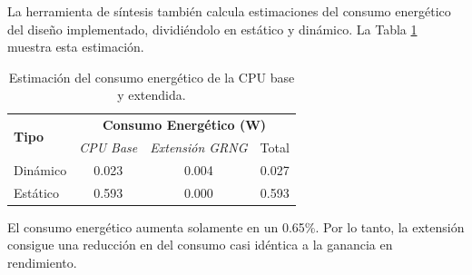 La herramienta de síntesis también calcula estimaciones del consumo energético del diseño implementado, dividiéndolo en estático y dinámico. La Tabla \ref{tab:riscv_fpga_power} muestra esta estimación. 

\begin{table}[h]
\centering
\caption{Estimación del consumo energético de la CPU base y extendida.}
\label{tab:riscv_fpga_power}
\begin{tabular}{lccc}
\hline
\multirow{2}{*}{\textbf{Tipo}} & \multicolumn{3}{c}{\textbf{Consumo Energético (W)}} \\
 & \textit{CPU Base} & \textit{Extensión GRNG} & Total \\ \hline
Dinámico & 0.023 & 0.004 & 0.027\\
Estático & 0.593 & 0.000 & 0.593\\ \hline
\end{tabular}
\end{table}

El consumo energético aumenta solamente en un 0.65\%. Por lo tanto, la extensión consigue una reducción en del consumo casi idéntica a la ganancia en rendimiento.
